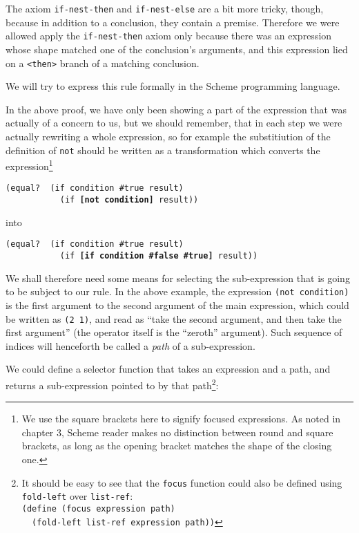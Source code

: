 The axiom \texttt{if-nest-then} and \texttt{if-nest-else} are
a bit more tricky, though, because in addition to a conclusion,
they contain a premise. Therefore we were allowed apply the
\texttt{if-nest-then} axiom only because there was an expression
whose shape matched one of the conclusion's arguments, and
this expression lied on a \texttt{<then>} branch of a matching
conclusion.

We will try to express this rule formally in the Scheme
programming language.

In the above proof, we have only been showing a part of the
expression that was actually of a concern to us, but we should
remember, that in each step we were actually rewriting a whole
expression, so for example the substitiution of the definition
of \texttt{not} should be written as a transformation which
converts the expression\footnote{We use the square brackets
  here to signify focused expressions. As noted in chapter 3,
  Scheme reader makes no distinction between round and square
  brackets, as long as the opening bracket matches the shape
  of the closing one.}

\texttt{(equal?\,\,(if condition \#true result) \\
\-\ \ \ \ \ \ \ \ \ \ \ (if \textbf{[not condition]} result))}

into

\texttt{(equal?\,\,(if condition \#true result) \\
\-\ \ \ \ \ \ \ \ \ \ \ (if \textbf{[if condition \#false \#true]} result))}

We shall therefore need some means for selecting the sub-expression
that is going to be subject to our rule. In the above example, the
expression \texttt{(not condition)} is the first argument to the second
argument of the main expression, which could be written as
\texttt{(2 1)}, and read as ``take the second argument, and then take
the first argument'' (the operator itself is the ``zeroth'' argument).
Such sequence of indices will henceforth be called a \textit{path}
of a sub-expression.

We could define a selector function that takes an expression
and a path, and returns a sub-expression pointed to by that path\footnote{
  It should be easy to see that the \texttt{focus} function could also
  be defined using \texttt{fold-left} over \texttt{list-ref}: \\
  \texttt{(define (focus expression path) \\
    \-\ \ (fold-left list-ref expression path))}
}:

